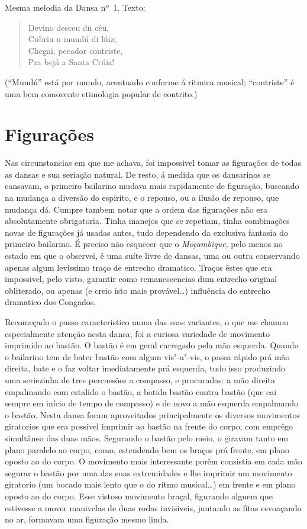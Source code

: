 Mesma melodia da Dansa nº~1. Texto:

\begin{verse}
Devino desceu du céu,\\
Cubriu u mundú di lúiz;\\
Chegai, pecador contriste,\\
Pra bejá a Santa Crúiz!
\end{verse}
(``Mundú'' está por mundo, acentuado conforme á ritmica musical;
``contriste'' é uma bem comovente etimologia popular de contrito.)

\section{Figurações}

Nas circunstancias em que me achava, foi impossivel tomar as figurações
de todas as dansas e sua seriação natural. De resto, á medida que os
dansarinos se cansavam, o primeiro bailarino mudava mais rapidamente de
figuração, buscando na mudança a diversão do espirito, e o repouso, ou a
ilusão de repouso, que mudança dá. Cumpre tambem notar que a ordem das
figurações não era absolutamente obrigatoria. Tinha manejos que se
repetiam, tinha combinações novas de figurações já usadas antes, tudo
dependendo da exclusiva fantasia do primeiro bailarino. É preciso não
esquecer que o \emph{Moçambique}, pelo menos no estado em que o
observei, é uma suíte livre de dansas, uma ou outra conservando apenas
algum levissimo traço de entrecho dramatico. Traços êstes que era
impossivel, pelo visto, garantir como remanescencias dum entrecho
original obliterado, ou apenas (e creio isto mais provável\ldots{})
influência do entrecho dramatico dos Congados.

Recomeçado o passo caracteristico numa das suas variantes, o que me
chamou especialmente atenção nesta dansa, foi a curiosa variedade de
movimento imprimido ao bastão. O bastão é em geral carregado pela mão
esquerda. Quando o bailarino tem de bater bastão com algum vis"-a"-vis, o
passa rápido prá mão direita, bate e o faz voltar imediatamente prá
esquerda, tudo isso produzindo uma seriezinha de tres percussões a
compasso, e procuradas: a mão direita empalmando com estalido o bastão,
a batida bastão contra bastão (que cai sempre em início de tempo de
compasso) e de novo a mão esquerda empalmando o bastão. Nesta dansa
foram aproveitados principalmente os diversos movimentos giratorios que
era possivel imprimir ao bastão na frente do corpo, com emprêgo
simultâneo das duas mãos. Segurando o bastão pelo meio, o giravam tanto
em plano paralelo ao corpo, como, estendendo bem os braços prá frente,
em plano oposto ao do corpo. O movimento mais interessante porêm
consistia em cada mão segurar o bastão por uma das suas extremidades e
lhe imprimir um movimento giratorio (um bocado mais lento que o do ritmo
musical\ldots{}) em frente e em plano oposto ao do corpo. Esse vistoso
movimento braçal, figurando alguem que estivesse a mover manivelas de
duas rodas invisiveis, juntando as fitas esvoaçando no ar, formavam uma
figuração mesmo linda.

